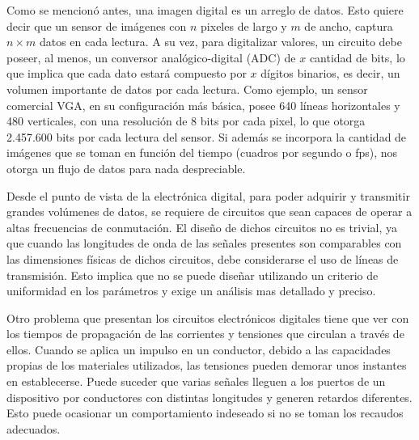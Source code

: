 Como se mencionó antes, una imagen digital es un arreglo de datos. Esto quiere decir que un sensor de imágenes con $n$ pixeles de largo y $m$ de ancho, captura $n\times m$ datos en cada lectura. A su vez, para digitalizar valores, un circuito debe poseer, al menos, un conversor analógico-digital (ADC) de $x$ cantidad de bits, lo que implica que cada dato estará compuesto por $x$ dígitos binarios, es decir, un volumen importante de datos por cada lectura. Como ejemplo, un sensor comercial VGA, en su configuración más básica, posee 640 líneas horizontales y 480 verticales, con una resolución de 8 bits por cada pixel, lo que otorga 2.457.600 bits por cada lectura del sensor.\cite{ONSemiconductor2014} Si además se incorpora la cantidad de imágenes que se toman en función del tiempo (cuadros por segundo o fps), nos otorga un flujo de datos para nada despreciable.%

Desde el punto de vista de la electrónica digital, para poder adquirir y transmitir grandes volúmenes de datos, se requiere de circuitos que sean capaces de operar a altas frecuencias de conmutación. El diseño de dichos circuitos no es trivial, ya que cuando las longitudes de onda de las señales presentes son comparables con las dimensiones físicas de dichos circuitos, debe considerarse el uso de líneas de transmisión\cite{Ida2015}. Esto implica que no se puede diseñar utilizando un criterio de uniformidad en los parámetros y exige un análisis mas detallado y preciso.%

Otro problema que presentan los circuitos electrónicos digitales tiene que ver con los tiempos de propagación de las corrientes y tensiones que circulan a través de ellos. Cuando se aplica un impulso en un conductor, debido a las capacidades propias de los materiales utilizados, las tensiones pueden demorar unos instantes en establecerse. Puede suceder que varias señales lleguen a los puertos de un dispositivo por conductores con distintas longitudes y generen retardos diferentes. Esto puede ocasionar un comportamiento indeseado si no se toman los recaudos adecuados.%

